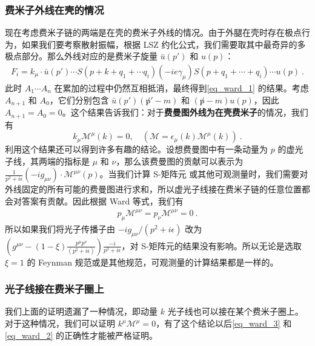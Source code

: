 \subsubsection{费米子外线在壳的情况}
现在考虑费米子链的两端是在壳的费米子外线的情况。由于外腿在壳时存在极点行为，如果我们要考察散射振幅，根据 LSZ 约化公式，我们需要取其中最奇异的多极点部分。那么外线对应的是费米子旋量 $\bar u(p')$ 和 $u(p)$：
\begin{equation}
\begin{aligned}
F_i = k_\mu \cdot \bar u(p')\cdots S(p+k+q_1+\cdots q_i)(-ie\gamma_\mu)S(p+q_1+\cdots + q_i)\cdots u(p)~.
\end{aligned}
\end{equation}
此时 $A_1\cdots A_n$ 在累加的过程中仍然互相抵消，最终得到\autoref{eq_ward_1} 的结果。考虑 $A_{n+1}$ 和 $A_0$，它们分别包含 $\bar u(p')(\not p'-m)$ 和 $(\not p-m)u(p)$，因此 $A_{n+1}=A_0=0$。这个结果告诉我们：对于\textbf{费曼图外线为在壳费米子}的情况，我们有
\begin{equation}
k_\mu \mathcal{M}^\mu(k) = 0,\quad (\mathcal{M} = \epsilon_\mu(k)\mathcal{M}^\mu(k))~.
\end{equation}
利用这个结果还可以得到许多有趣的结论。设想费曼图中有一条动量为 $p$ 的虚光子线，其两端的指标是 $\mu$ 和 $\nu$，那么该费曼图的贡献可以表示为 $\frac{1}{p^2+i\epsilon}(-ig_{\mu\nu})\cdot\mathcal{M}^{\mu\nu}(p)$。当我们计算 S-矩阵元 或其他可观测量时，我们需要对外线固定的所有可能的费曼图进行求和，所以虚光子线接在费米子链的任意位置都会对答案有贡献。因此根据 Ward 等式，我们有
\begin{equation}
\begin{aligned}
p_\mu \mathcal{M}^{\mu\nu} = p_\nu\mathcal{M}^{\mu\nu}= 0~.
\end{aligned}
\end{equation}
所以如果我们将光子传播子由 $-ig_{\mu\nu}/(p^2+i\epsilon)$ 改为 $\left(g^{\mu\nu}-(1-\xi)\frac{p^\mu p^\nu}{ (p^2+i\epsilon)}\right)\frac{-i}{p^2+i\epsilon}$，对 S-矩阵元的结果没有影响。所以无论是选取 $\xi=1$ 的 Feynman 规范或是其他规范，可观测量的计算结果都是一样的。
\subsubsection{光子线接在费米子圈上}
我们上面的证明遗漏了一种情况，即动量 $k$ 光子线也可以接在某个费米子圈上。对于这种情况，我们可以证明 $k^\mu \mathcal{M}^\mu=0$，有了这个结论以后\autoref{eq_ward_3} 和\autoref{eq_ward_2} 的正确性才能被严格证明。


